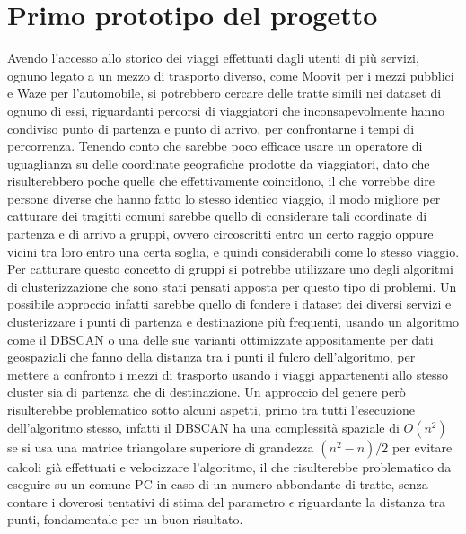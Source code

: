 \section{Primo prototipo del progetto}

Avendo l'accesso allo storico dei viaggi effettuati dagli utenti di più servizi, ognuno legato a un mezzo di trasporto diverso, come Moovit per i mezzi pubblici e Waze per l'automobile, si potrebbero cercare delle tratte simili nei dataset di ognuno di essi, riguardanti percorsi di viaggiatori che inconsapevolmente hanno condiviso punto di partenza e punto di arrivo, per confrontarne i tempi di percorrenza. Tenendo conto che sarebbe poco efficace usare un operatore di uguaglianza su delle coordinate geografiche prodotte da viaggiatori, dato che risulterebbero poche quelle che effettivamente coincidono, il che vorrebbe dire persone diverse che hanno fatto lo stesso identico viaggio, il modo migliore per catturare dei tragitti comuni sarebbe quello di considerare tali coordinate di partenza e di arrivo a gruppi, ovvero circoscritti entro un certo raggio oppure vicini tra loro entro una certa soglia, e quindi considerabili come lo stesso viaggio. Per catturare questo concetto di gruppi si potrebbe utilizzare uno degli algoritmi di clusterizzazione che sono stati pensati apposta per questo tipo di problemi. Un possibile approccio infatti sarebbe quello di fondere i dataset dei diversi servizi e clusterizzare i punti di partenza e destinazione più frequenti, usando un algoritmo come il DBSCAN \cite{ester1996density} o una delle sue varianti ottimizzate appositamente per dati geospaziali \cite{zhou2000combining}\cite{borah2004improved} che fanno della distanza tra i punti il fulcro dell'algoritmo, per mettere a confronto i mezzi di trasporto usando i viaggi appartenenti allo stesso cluster sia di partenza che di destinazione. Un approccio del genere però risulterebbe problematico sotto alcuni aspetti, primo tra tutti l'esecuzione dell'algoritmo stesso, infatti il DBSCAN ha una complessità spaziale di $O(n^2)$ se si usa una matrice triangolare superiore di grandezza $(n^2 - n) / 2$ per evitare calcoli già effettuati e velocizzare l'algoritmo, il che risulterebbe problematico da eseguire su un comune PC in caso di un numero abbondante di tratte, senza contare i doverosi tentativi di stima del parametro $\epsilon$ riguardante la distanza tra punti, fondamentale per un buon risultato.


